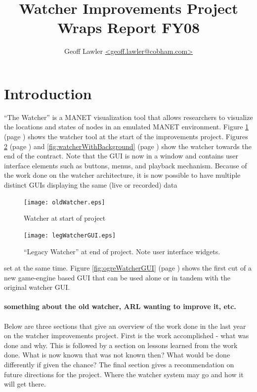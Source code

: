 \documentclass{report}
\author{Geoff Lawler \url{<geoff.lawler@cobham.com>}}
\title{{\bf Watcher Improvements Project}\\Wraps Report FY08}
\begin{document}
\maketitle

\renewcommand*\thesection{\arabic{section}}

\section{Introduction}

``The Watcher'' is a MANET visualization tool that allows researchers to visualize the locations and states of nodes in an emulated MANET environment. 
Figure \ref{fig:oldWatcher} (page \pageref{fig:oldWatcher}) shows the watcher tool at the start of the improvements project. Figures \ref{fig:legWatcherGUI} (page \pageref{fig:legWatcherGUI}) and \ref{fig:watcherWithBackground}
(page \pageref{fig:watcherWithBackground}) show the watcher towards the end of the contract. Note that the GUI is now in a window and contains user interface elements such as buttons, menus, and playback
mechanism. Because of the work done on the watcher architecture, it is now possible to have multiple distinct GUIs displaying the same (live or recorded) data 

\begin{figure}[htb]
\label{fig:oldWatcher}
\centering
\texttt{[image: oldWatcher.eps]}
\caption{Watcher at start of project}
\end{figure}

\begin{figure}[htb]
\label{fig:legWatcherGUI}
\centering
\texttt{[image: legWatcherGUI.eps]}
\caption{``Legacy Watcher'' at end of project. Note user interface widgets.}
\end{figure}

set at the same time. Figure \ref{fig:ogreWatcherGUI} (page \pageref{fig:ogreWatcherGUI}) shows the first cut of a new game-engine based GUI that can be used alone or in tandem with the original watcher GUI. 
\\\\
{\bf something about the old watcher, ARL wanting to improve it, etc. }
\\\\
Below are three sections that give an overview of the work done in the last year on the watcher improvements project. First
is the work accomplished - what was done and why. This is followed by a section on lessons learned from the work done. What is now known 
that was not known then? What would be done differently if given the chance? The final section gives a recommendation on future directions
for the project. Where the watcher system may go and how it will get there. 
\end{document}
